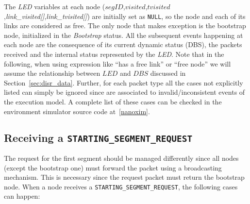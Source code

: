 The \emph{LED} variables at each node
($segID$,$visited$,$tvisited$,\emph{link\_visited[]},\emph{link\_tvisited[]})
are initially set as \texttt{NULL}, so the node and each of its links
are considered as free.
The only node that makes exception is the bootstrap node, initialized
in the \emph{Bootstrap} status. All the subsequent events happening at
each node are the consequence of its current dynamic status (DBS), the
packets received and the internal status represented by the
\emph{LED}. Note that in the following, when using expression like
``has a free link'' or ``free node'' we will assume the relationship between 
$LED$ and $DBS$ discussed in Section~\ref{sec:disr_data}. Further, for
each packet type all the cases not explicitly listed can simply be
ignored since are associated to invalid/inconsistent events of the
\disr{} execution model. A complete list of these cases can be checked
in the environment simulator source code at~\ref{nanoxim}.

\subsection{Receiving a \texttt{STARTING\_SEGMENT\_REQUEST}}

The request for the first segment should be managed differently since
all nodes (except the bootstrap one) must forward the packet using a
broadcasting mechanism. This is necessary since the request packet must
return the bootstrap node.
When a node receives a \texttt{STARTING\_SEGMENT\_REQUEST}, the
following cases can happen:

